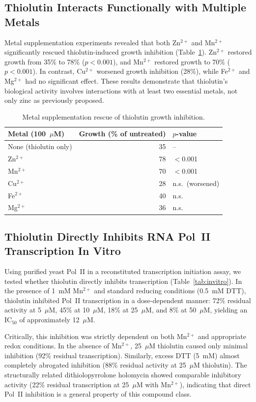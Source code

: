 \documentclass[11pt]{article}
\begin{document}
\subsection{Thiolutin Interacts Functionally with Multiple Metals}

Metal supplementation experiments revealed that both Zn$^{2+}$ and Mn$^{2+}$ significantly rescued thiolutin-induced growth inhibition (Table~\ref{tab:metals}). Zn$^{2+}$ restored growth from 35\% to 78\% ($p < 0.001$), and Mn$^{2+}$ restored growth to 70\% ($p < 0.001$). In contrast, Cu$^{2+}$ worsened growth inhibition (28\%), while Fe$^{2+}$ and Mg$^{2+}$ had no significant effect. These results demonstrate that thiolutin's biological activity involves interactions with at least two essential metals, not only zinc as previously proposed.

\begin{table}[ht]
\centering
\caption{Metal supplementation rescue of thiolutin growth inhibition.}
\label{tab:metals}
\begin{tabular}{lrl}
\toprule
\textbf{Metal (100~$\mu$M)} & \textbf{Growth (\% of untreated)} & \textbf{$p$-value} \\
\midrule
None (thiolutin only) & 35 & -- \\
Zn$^{2+}$ & 78 & $<$0.001 \\
Mn$^{2+}$ & 70 & $<$0.001 \\
Cu$^{2+}$ & 28 & n.s.\ (worsened) \\
Fe$^{2+}$ & 40 & n.s. \\
Mg$^{2+}$ & 36 & n.s. \\
\bottomrule
\end{tabular}
\end{table}

\subsection{Thiolutin Directly Inhibits RNA Pol~II Transcription In Vitro}

Using purified yeast Pol~II in a reconstituted transcription initiation assay, we tested whether thiolutin directly inhibits transcription (Table~\ref{tab:invitro}). In the presence of 1~mM Mn$^{2+}$ and standard reducing conditions (0.5~mM DTT), thiolutin inhibited Pol~II transcription in a dose-dependent manner: 72\% residual activity at 5~$\mu$M, 45\% at 10~$\mu$M, 18\% at 25~$\mu$M, and 8\% at 50~$\mu$M, yielding an IC$_{50}$ of approximately 12~$\mu$M.

Critically, this inhibition was strictly dependent on both Mn$^{2+}$ and appropriate redox conditions. In the absence of Mn$^{2+}$, 25~$\mu$M thiolutin caused only minimal inhibition (92\% residual transcription). Similarly, excess DTT (5~mM) almost completely abrogated inhibition (88\% residual activity at 25~$\mu$M thiolutin). The structurally related dithiolopyrrolone holomycin showed comparable inhibitory activity (22\% residual transcription at 25~$\mu$M with Mn$^{2+}$), indicating that direct Pol~II inhibition is a general property of this compound class.
\end{document}

